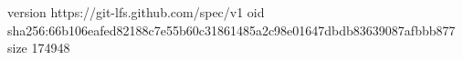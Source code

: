 version https://git-lfs.github.com/spec/v1
oid sha256:66b106eafed82188c7e55b60c31861485a2c98e01647dbdb83639087afbbb877
size 174948
